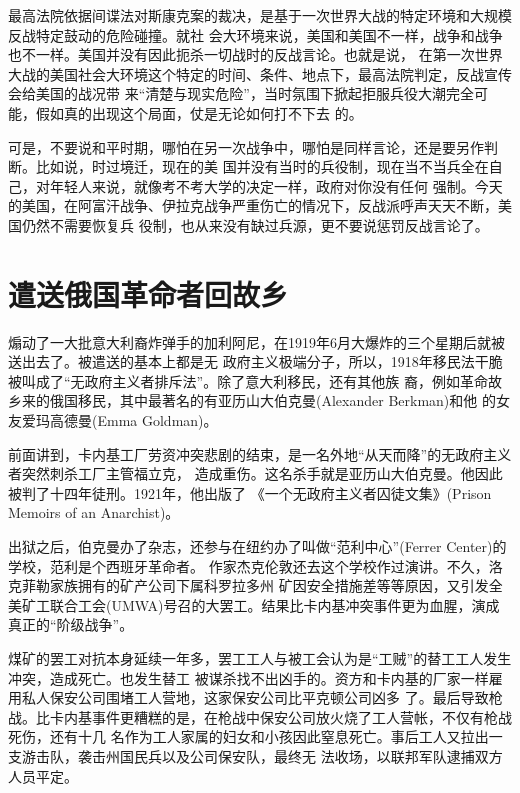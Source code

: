 \documentclass[10pt]{article}
\begin{document}
{最高法院依据间谍法对斯康克案的裁决，是基于一次世界大战的特定环境和大规模反战特定鼓动的危险碰撞。就社
会大环境来说，美国和美国不一样，战争和战争也不一样。美国并没有因此扼杀一切战时的反战言论。也就是说，
在第一次世界大战的美国社会大环境这个特定的时间、条件、地点下，最高法院判定，反战宣传会给美国的战况带
来``清楚与现实危险''，当时氛围下掀起拒服兵役大潮完全可能，假如真的出现这个局面，仗是无论如何打不下去
的。

可是，不要说和平时期，哪怕在另一次战争中，哪怕是同样言论，还是要另作判断。比如说，时过境迁，现在的美
国并没有当时的兵役制，现在当不当兵全在自己，对年轻人来说，就像考不考大学的决定一样，政府对你没有任何
强制。今天的美国，在阿富汗战争、伊拉克战争严重伤亡的情况下，反战派呼声天天不断，美国仍然不需要恢复兵
役制，也从来没有缺过兵源，更不要说惩罚反战言论了。

\pagebreak
\section{遣送俄国革命者回故乡}

煽动了一大批意大利裔炸弹手的加利阿尼，在1919年6月大爆炸的三个星期后就被送出去了。被遣送的基本上都是无
政府主义极端分子，所以，1918年移民法干脆被叫成了``无政府主义者排斥法''。除了意大利移民，还有其他族
裔，例如革命故乡来的俄国移民，其中最著名的有亚历山大\textperiodcentered 伯克曼(Alexander Berkman)和他
的女友爱玛\textperiodcentered 高德曼(Emma Goldman)。

前面讲到，卡内基工厂劳资冲突悲剧的结束，是一名外地``从天而降''的无政府主义者突然刺杀工厂主管福立克，
造成重伤。这名杀手就是亚历山大\textperiodcentered 伯克曼。他因此被判了十四年徒刑。1921年，他出版了
《一个无政府主义者囚徒文集》(Prison Memoirs of an Anarchist)。

出狱之后，伯克曼办了杂志，还参与在纽约办了叫做``范利中心''(Ferrer Center)的学校，范利是个西班牙革命者。
作家杰克\textperiodcentered 伦敦还去这个学校作过演讲。不久，洛克菲勒家族拥有的矿产公司下属科罗拉多州
矿因安全措施差等等原因，又引发全美矿工联合工会(UMWA)号召的大罢工。结果比卡内基冲突事件更为血腥，演成
真正的``阶级战争''。

煤矿的罢工对抗本身延续一年多，罢工工人与被工会认为是``工贼''的替工工人发生冲突，造成死亡。也发生替工
被谋杀找不出凶手的。资方和卡内基的厂家一样雇用私人保安公司围堵工人营地，这家保安公司比平克顿公司凶多
了。最后导致枪战。比卡内基事件更糟糕的是，在枪战中保安公司放火烧了工人营帐，不仅有枪战死伤，还有十几
名作为工人家属的妇女和小孩因此窒息死亡。事后工人又拉出一支游击队，袭击州国民兵以及公司保安队，最终无
法收场，以联邦军队逮捕双方人员平定。

}
\end{document}
